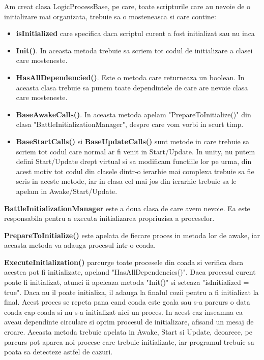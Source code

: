 \documentclass[12pt, a4paper]{article}
\begin{document}
	Am creat clasa LogicProcessBase, pe care, toate scripturile care au nevoie de o initializare mai organizata, trebuie sa o mosteneasca si care contine:
	\begin{itemize}
		\item \textbf{isInitialized} care specifica daca scriptul curent a fost initializat sau nu inca
		\item \textbf{Init()}. In aceasta metoda trebuie sa scriem tot codul de initializare a clasei care mosteneste.
		\item \textbf{HasAllDependencied()}. Este o metoda care returneaza un boolean. In aceasta clasa trebuie sa punem toate dependintele de care are nevoie clasa care mosteneste.
		\item \textbf{BaseAwakeCalls()}. In aceasta metoda apelam "PrepareToInitialize()" din clasa "BattleInitializationManager", despre care vom vorbi in scurt timp.
		\item \textbf{BaseStartCalls()} si \textbf{BaseUpdateCalls()} sunt metode in care trebuie sa scriem tot codul care normal ar fi venit in Start/Update. In unity, nu putem defini Start/Update drept virtual si sa modificam functiile lor pe urma, din acest motiv tot codul din clasele dintr-o ierarhie mai complexa trebuie sa fie scris in aceste metode, iar in clasa cel mai jos din ierarhie trebuie sa le apelam in Awake/Start/Update.
	\end{itemize}

	\textbf{BattleInitializationManager} este a doua clasa de care avem nevoie. Ea este responsabila pentru a executa initializarea propriuzisa a proceselor. 
	
	\textbf{PrepareToInitialize()} este apelata de fiecare proces in metoda lor de awake, iar aceasta metoda va adauga procesul intr-o coada.
	
	\textbf{ExecuteInitialization()} parcurge toate procesele din coada si verifica daca acestea pot fi initializate, apeland "HasAllDependencies()". Daca procesul curent poate fi initializat, atunci ii apeleaza metoda "Init()" si seteaza "isInitialized = true". Daca nu il poate initializa, il adauga la finalul cozii pentru a fi initializat la final. Acest proces se repeta pana cand coada este goala sau s-a parcurs o data coada cap-coada si nu s-a initializat nici un proces. In acest caz inseamna ca aveau dependinte circulare si oprim procesul de initializare, afisand un mesaj de eroare. Aceasta metoda trebuie apelata in Awake, Start si Update, deoarece, pe parcurs pot aparea noi procese care trebuie initializate, iar programul trebuie sa poata sa detecteze astfel de cazuri.
	
\end{document}
